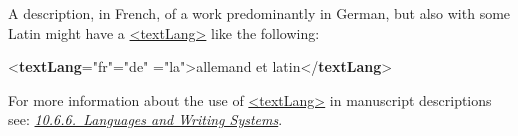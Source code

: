 A description, in French, of a work predominantly in German, but also with some Latin might have a \hyperref[TEI.textLang]{<textLang>} like the following: \par\bgroup{}\exampleFont \begin{shaded}\noindent\mbox{}{<\textbf{textLang}\hspace*{1em}{xml:lang}="{fr}"\hspace*{1em}{mainLang}="{de}"\mbox{}\newline 
\hspace*{1em}{otherLangs}="{la}">}allemand et latin{</\textbf{textLang}>}\end{shaded}\egroup\par \noindent  For more information about the use of \hyperref[TEI.textLang]{<textLang>} in manuscript descriptions see: \textit{\hyperref[mslangs]{10.6.6.\ Languages and Writing Systems}}.
